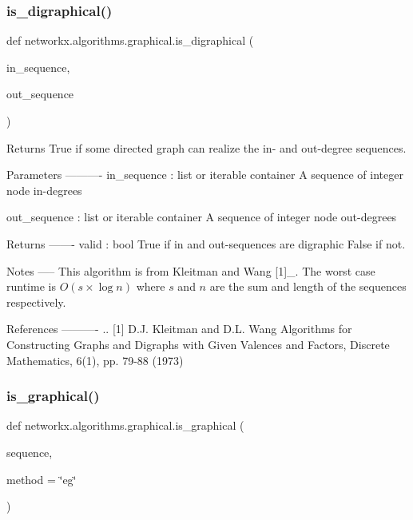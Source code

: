 \subsubsection{\texorpdfstring{is\+\_\+digraphical()}{is\_digraphical()}}
{\footnotesize\ttfamily def networkx.\+algorithms.\+graphical.\+is\+\_\+digraphical (\begin{DoxyParamCaption}\item[{}]{in\+\_\+sequence,  }\item[{}]{out\+\_\+sequence }\end{DoxyParamCaption})}

\begin{DoxyVerb}Returns True if some directed graph can realize the in- and out-degree
sequences.

Parameters
----------
in_sequence : list or iterable container
    A sequence of integer node in-degrees

out_sequence : list or iterable container
    A sequence of integer node out-degrees

Returns
-------
valid : bool
  True if in and out-sequences are digraphic False if not.

Notes
-----
This algorithm is from Kleitman and Wang [1]_.
The worst case runtime is $O(s \times \log n)$ where $s$ and $n$ are the
sum and length of the sequences respectively.

References
----------
.. [1] D.J. Kleitman and D.L. Wang
   Algorithms for Constructing Graphs and Digraphs with Given Valences
   and Factors, Discrete Mathematics, 6(1), pp. 79-88 (1973)
\end{DoxyVerb}
 \mbox{\label{namespacenetworkx_1_1algorithms_1_1graphical_a12a31175e624d480023ceb0defee47b9}} 
\subsubsection{\texorpdfstring{is\+\_\+graphical()}{is\_graphical()}}
{\footnotesize\ttfamily def networkx.\+algorithms.\+graphical.\+is\+\_\+graphical (\begin{DoxyParamCaption}\item[{}]{sequence,  }\item[{}]{method = {\ttfamily \char`\"{}eg\char`\"{}} }\end{DoxyParamCaption})}

